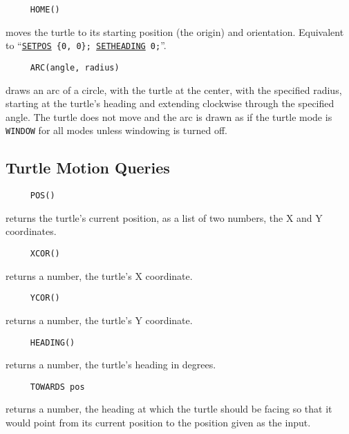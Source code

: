 \begin{verbatim}
     HOME()
\end{verbatim}
\label{logoturtle:home}
moves the turtle to its starting position (the origin) and orientation.
Equivalent to ``\texttt{\hyperref[logoturtle:setpos]{SETPOS}~\{0,~0\};
  \hyperref[logoturtle:setheading]{SETHEADING}~0;}''.

\begin{verbatim}
     ARC(angle, radius)
\end{verbatim}
draws an arc of a circle, with the turtle at the center, with the
specified radius, starting at the turtle's heading and extending
clockwise through the specified angle.  The turtle does not move and
the arc is drawn as if the turtle mode is \texttt{WINDOW} for all
modes unless windowing is turned off.


\subsection{Turtle Motion Queries}

\begin{verbatim}
     POS()
\end{verbatim}
returns the turtle's current position, as a list of two numbers, the X
and Y coordinates.

\begin{verbatim}
     XCOR()
\end{verbatim}
returns a number, the turtle's X coordinate.

\begin{verbatim}
     YCOR()
\end{verbatim}
returns a number, the turtle's Y coordinate.

\begin{verbatim}
     HEADING()
\end{verbatim}
returns a number, the turtle's heading in degrees.

\begin{verbatim}
     TOWARDS pos
\end{verbatim}
returns a number, the heading at which the turtle should be facing so
that it would point from its current position to the position given as
the input.


